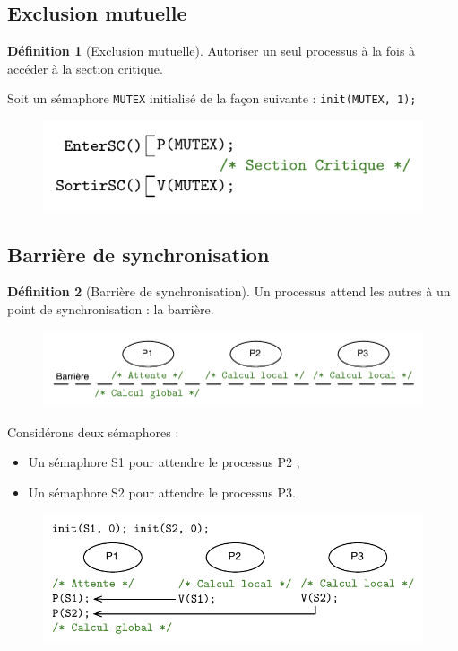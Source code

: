\documentclass[11pt,english,french]{scrreprt}
\theoremstyle{remark}
\theoremstyle{definition}
\newtheorem*{def*}{Définition}
\begin{document}
\subsection{Exclusion mutuelle}

\begin{def*}[Exclusion mutuelle]
	Autoriser un seul processus à la fois à accéder à la section critique.
\end{def*}

Soit un sémaphore \lstinline!MUTEX! initialisé de la façon suivante : \lstinline!init(MUTEX, 1);!

\begin{figure}[h!]
	\center
	\includegraphics[scale=.85]{img/MUTEX}
\end{figure}

\subsection{Barrière de synchronisation}

\begin{def*}[Barrière de synchronisation]
	Un processus attend les autres à un point de synchronisation : la barrière.
\end{def*}

\begin{figure}[h!]
	\center
	\includegraphics[scale=.85]{img/barriere1}
\end{figure}

Considérons deux sémaphores : \begin{itemize}
\item Un sémaphore S1 pour attendre le processus P2 ;
\item Un sémaphore S2 pour attendre le processus P3.
\end{itemize}

\begin{figure}[h!]
	\center
	\includegraphics[scale=.85]{img/barriere2}
\end{figure}
\end{document}
